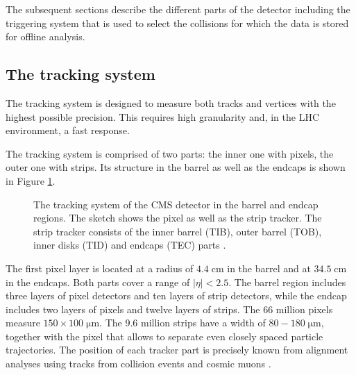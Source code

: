 The subsequent sections describe the different parts of the detector including the triggering system that is used to select the collisions for which the data is stored for offline analysis.


\subsection{The tracking system}
\label{set:det_tracker}

The tracking system \cite{Bayatian:922757} is designed to measure both tracks and vertices with the highest possible precision.
This requires high granularity and, in the LHC environment, a fast response.

The tracking system is comprised of two parts: the inner one with pixels, the outer one with strips.
Its structure in the barrel as well as the endcaps is shown in Figure \ref{fig:det_Tracker}.

\begin{figure}[htbp!]
  \begin{center}

\caption{The tracking system of the CMS detector in the barrel and endcap regions. The sketch shows the pixel as well as the strip tracker. The strip tracker consists of the inner barrel (TIB), outer barrel (TOB), inner disks (TID) and endcaps (TEC) parts \cite{Dominguez:1481838}.
  \label{fig:det_Tracker}}
  \end{center}
\end{figure}



The first pixel layer is located at a radius of $4.4 \;\si{\centi \meter}$ in the barrel and at $34.5 \;\si{\centi \meter}$ in the endcaps.
Both parts cover a range of $|\eta| < 2.5$.
The barrel region includes three layers of pixel detectors and ten layers of strip detectors, while the endcap includes two layers of pixels and twelve layers of strips.
The 66 million pixels measure $150 \times 100 \; \si{\micro \meter}$. The 9.6 million strips have a width of $80-180  \;\si{\micro \meter}$, together with the pixel that allows to separate even closely spaced
particle trajectories.
The position of each tracker part is precisely known from alignment analyses using tracks from collision events and cosmic muons \cite{Chatrchyan:2014wfa}.

